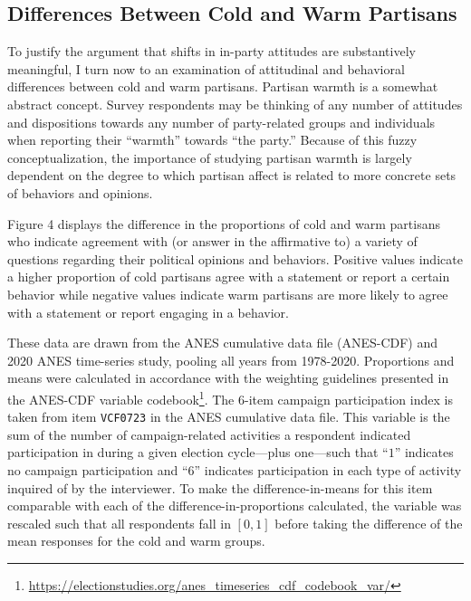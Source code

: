 \documentclass[
]{article}
\begin{document}
\clearpage

\hypertarget{differences-between-cold-and-warm-partisans}{%
\subsection{Differences Between Cold and Warm Partisans}\label{differences-between-cold-and-warm-partisans}}

To justify the argument that shifts in in-party attitudes are substantively meaningful, I turn now to an examination of attitudinal and behavioral differences between cold and warm partisans. Partisan warmth is a somewhat abstract concept. Survey respondents may be thinking of any number of attitudes and dispositions towards any number of party-related groups and individuals when reporting their ``warmth'' towards ``the party.'' Because of this fuzzy conceptualization, the importance of studying partisan warmth is largely dependent on the degree to which partisan affect is related to more concrete sets of behaviors and opinions.

Figure 4 displays the difference in the proportions of cold and warm partisans who indicate agreement with (or answer in the affirmative to) a variety of questions regarding their political opinions and behaviors. Positive values indicate a higher proportion of cold partisans agree with a statement or report a certain behavior while negative values indicate warm partisans are more likely to agree with a statement or report engaging in a behavior.

These data are drawn from the ANES cumulative data file (ANES-CDF) and 2020 ANES time-series study, pooling all years from 1978-2020. Proportions and means were calculated in accordance with the weighting guidelines presented in the ANES-CDF variable codebook\footnote{\url{https://electionstudies.org/anes_timeseries_cdf_codebook_var/}}. The 6-item campaign participation index is taken from item \texttt{VCF0723} in the ANES cumulative data file. This variable is the sum of the number of campaign-related activities a respondent indicated participation in during a given election cycle---plus one---such that ``\(1\)'' indicates no campaign participation and ``\(6\)'' indicates participation in each type of activity inquired of by the interviewer. To make the difference-in-means for this item comparable with each of the difference-in-proportions calculated, the variable was rescaled such that all respondents fall in \([0,1]\) before taking the difference of the mean responses for the cold and warm groups.
\end{document}
